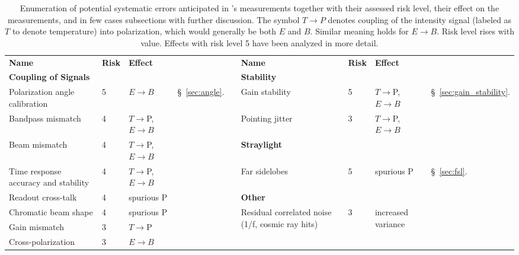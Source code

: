 \begin{table}[h!]
\hspace{-0.1in}
\centering
\scriptsize
 \begin{tabular}{p{4.2cm} p{0.5cm} p{1.4cm} p{1.0cm} p{0.04cm} p{2.8cm} p{0.5cm} p{1.4cm} p{1.0cm}}
 \cline{1-4} \cline{6-9}
\textbf{Name} & \textbf{Risk}&\textbf{Effect} & &  & \textbf{Name} & \textbf{Risk}&\textbf{Effect} \\
 \cline{1-4} \cline{6-9}
\textbf{Coupling of Signals}& & & & &   \textbf{Stability} & & \\    
Polarization angle calibration\dotfill&
5&
$E{\to}B$ &
\S~\ref{sec:angle}. & &
Gain stability\dotfill&
5&
$T{\to}$P, $E{\to} B$
&
\S~\ref{sec:gain_stability}.
\\
 Bandpass mismatch\dotfill&
 4&
$T{\to}$P, $E{\to}B$ & & &
Pointing jitter\dotfill&
3&
$T{\to}$P, $E{\to}B$
   \\
\cline{6-9}
Beam mismatch\dotfill&
4&
$T{\to}$P, $E{\to}B$ & &
& %
\textbf{Straylight}& & 
\\
Time response accuracy and stability\dotfill&
4&
$T{\to}$P, $E{\to}B$ & & & 
Far sidelobes\dotfill&
5&
spurious P
&
\S~\ref{sec:fsl}.
\\
\cline{6-9}
Readout cross-talk\dotfill&
4&
spurious P & & &
\textbf{Other} 
\\
Chromatic beam shape\dotfill&
4&
spurious P & & &
\multirow{2}{3.3cm}{Residual correlated noise (1/f, cosmic ray hits)\dotfill}&
3 &
\multirow{2}{1.4cm}{increased variance}
\\
Gain mismatch\dotfill&
3&
$T{\to}$P
\\
Cross-polarization\dotfill&
3&
$E{\to}B$
\\
\cline{1-4}
\cline{6-9}
 \end{tabular}
\hspace{-0.0in}
\vspace{-0.1in}
\caption{\captiontext
Enumeration of potential systematic errors anticipated in \pico's measurements together with their assessed risk level,
their effect on the measurements, and in few cases subsections with further discussion. The symbol $T \rightarrow P $ denotes coupling of the intensity signal (labeled as $T$ to denote temperature) into polarization, which would generally be both $E$ and $B$. Similar meaning holds for $E \rightarrow B$. Risk level rises with value. Effects with risk level 5 have been analyzed in more detail.
}
\end{table}
